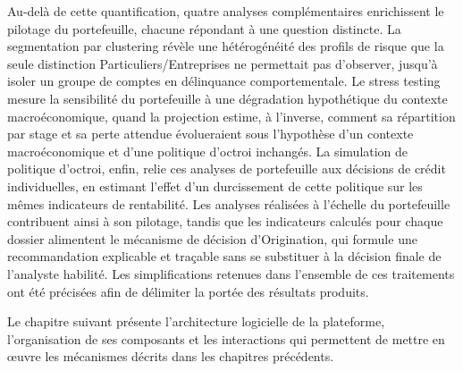 Au-delà de cette quantification, quatre analyses complémentaires enrichissent le pilotage du portefeuille, chacune répondant à une question distincte. La segmentation par clustering révèle une hétérogénéité des profils de risque que la seule distinction Particuliers/Entreprises ne permettait pas d'observer, jusqu'à isoler un groupe de comptes en délinquance comportementale. Le stress testing mesure la sensibilité du portefeuille à une dégradation hypothétique du contexte macroéconomique, quand la projection estime, à l'inverse, comment sa répartition par stage et sa perte attendue évolueraient sous l'hypothèse d'un contexte macroéconomique et d'une politique d'octroi inchangés. La simulation de politique d'octroi, enfin, relie ces analyses de portefeuille aux décisions de crédit individuelles, en estimant l'effet d'un durcissement de cette politique sur les mêmes indicateurs de rentabilité. Les analyses réalisées à l'échelle du portefeuille contribuent ainsi à son pilotage, tandis que les indicateurs calculés pour chaque dossier alimentent le mécanisme de décision d'Origination, qui formule une recommandation explicable et traçable sans se substituer à la décision finale de l'analyste habilité. Les simplifications retenues dans l'ensemble de ces traitements ont été précisées afin de délimiter la portée des résultats produits.

Le chapitre suivant présente l'architecture logicielle de la plateforme, l'organisation de ses composants et les interactions qui permettent de mettre en œuvre les mécanismes décrits dans les chapitres précédents.
